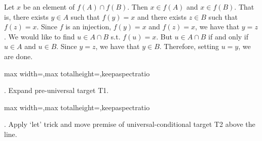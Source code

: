 \documentclass[a4paper,twoside,12pt]{article}
\makeatletter
\DeclareRobustCommand{\_}{%
  \leavevmode\vbox{%
    \hrule\@width.4em
          \@height-.16ex
          \@depth\dimexpr.16ex+.28pt\relax}}
\newcommand\Tstrut{\rule{0pt}{2.4ex}}
\newcommand\Bstrut{\rule[-1.1ex]{0pt}{0pt}}
\newenvironment{fit}{\begin{adjustbox}{max width=\textwidth,max totalheight=\textheight,keepaspectratio}}{\end{adjustbox}}
\makeatother
\begin{document}
\begin{center}
\begin{minipage}{120mm}
Let $x$ be an element of $f(A)\cap f(B)$. Then $x\in f(A)$ and $x\in f(B)$. That is, there exists $y\in A$ such that $f(y) = x$ and there exists $z\in B$ such that $f(z) = x$. Since $f$ is an injection, $f(y) = x$ and $f(z) = x$, we have that $y = z$. We would like to find $u\in A\cap B$ s.t. $f(u) = x$. But $u\in A\cap B$ if and only if $u\in A$ and $u\in B$. Since $y = z$, we have that $y\in B$. Therefore, setting $u = y$, we are done.
\end{minipage}
\end{center}

\bigskip
\begin{steps}
\begin{fit}%
\end{fit}
\smallskip

. Expand pre-universal target T1.\nopagebreak[4] 
\marginpar{}\nopagebreak[4] 
\smallskip\nopagebreak[4] 

\begin{fit}%
\end{fit}
\smallskip

. Apply `let' trick and move premise of universal-conditional target T2 above the line.\nopagebreak[4] 
\nopagebreak[4] 
\smallskip\nopagebreak[4] 


\end{steps}
\end{document}
